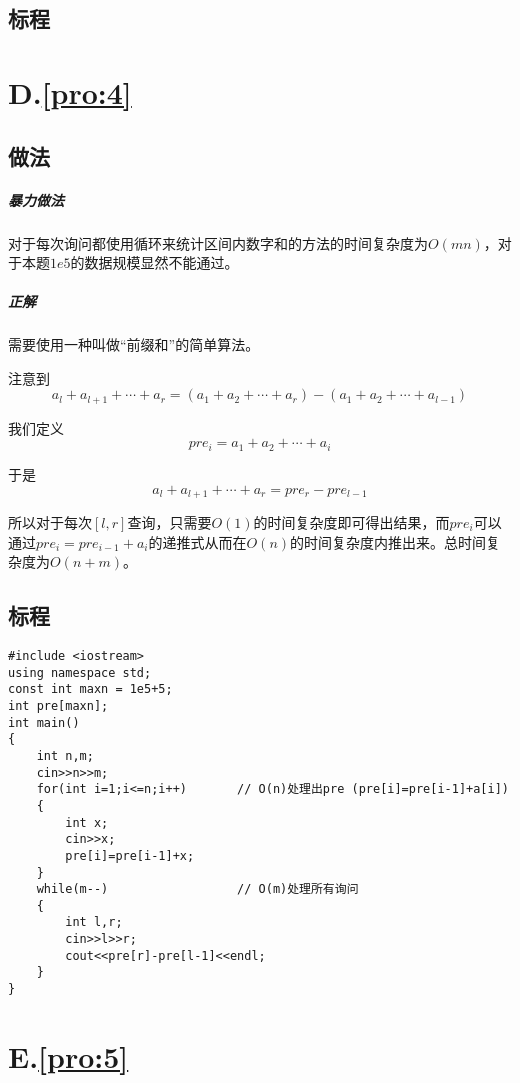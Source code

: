 \documentclass[
	lang=cn,
	color=blue
]{elegantbook}
\begin{document}
\section*{标程}

\chapter*{D.\quad \ref*{pro:4}}
\section*{做法}
\paragraph*{暴力做法} 对于每次询问都使用循环来统计区间内数字和的方法的时间复杂度为$O(mn)$，对于本题$1e5$的数据规模显然不能通过。

\paragraph*{正解} 需要使用一种叫做“前缀和”的简单算法。

注意到$$a_l+a_{l+1}+ \cdots + a_r = (a_1 + a_2 + \cdots + a_r) - (a_1 + a_2 + \cdots + a_{l-1})$$

我们定义$$pre_i = a_1 + a_2 + \cdots + a_i$$

于是$$a_l+a_{l+1}+ \cdots + a_r = pre_r - pre_{l-1}$$

所以对于每次$[l,r]$查询，只需要$O(1)$的时间复杂度即可得出结果，而$pre_i$可以通过$pre_i = pre_{i-1} + a_i$的递推式从而在$O(n)$的时间复杂度内推出来。总时间复杂度为$O(n+m)$。

\section*{标程}
\begin{lstlisting}
#include <iostream>
using namespace std;
const int maxn = 1e5+5;
int pre[maxn];
int main()
{
    int n,m;
    cin>>n>>m;
    for(int i=1;i<=n;i++)       // O(n)处理出pre (pre[i]=pre[i-1]+a[i])
    {
        int x;
        cin>>x;
        pre[i]=pre[i-1]+x;
    }
    while(m--)                  // O(m)处理所有询问
    {
        int l,r;
        cin>>l>>r;
        cout<<pre[r]-pre[l-1]<<endl;
    }
}
\end{lstlisting}

\chapter*{E.\quad \ref*{pro:5}}
\end{document}
